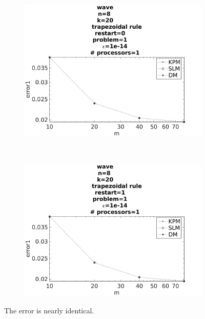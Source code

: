 \begin{figure}[H]
        \centering
        \begin{subfigure}[b]{0.45\textwidth}
                \includegraphics[width=\textwidth]{../MATLAB/fig/resulterrorr.jpg}
                \caption{  }
                \label{fig:resulterror1}
        \end{subfigure}
        ~
        \begin{subfigure}[b]{0.45\textwidth}
                \includegraphics[width=\textwidth]{../MATLAB/fig/resulterror.jpg}
                \caption{  }
                \label{fig:resulterror2}
        \end{subfigure}
        \caption{ The error is nearly identical.  }
        \label{fig:resulterror}
\end{figure}


